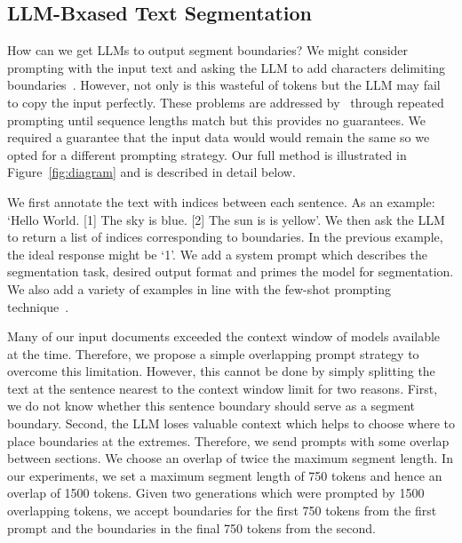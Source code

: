 \subsection{LLM-Bxased Text Segmentation}\label{LLM-Based Text Segmentation}

How can we get LLMs to output segment boundaries? We might consider prompting with the input text and asking the LLM to add characters delimiting boundaries~\citep{XingThesis}. However, not only is this wasteful of tokens but the LLM may fail to copy the input perfectly. These problems are addressed by~\citep{XingThesis} through repeated prompting until sequence lengths match but this provides no guarantees. We required a guarantee that the input data would would remain the same so we opted for a different prompting strategy. Our full method is illustrated in Figure~\ref{fig:diagram} and is described in detail below.

We first annotate the text with indices between each sentence. As an example: `Hello World. [1] The sky is blue. [2] The sun is is yellow'. We then ask the LLM to return a list of indices corresponding to boundaries. In the previous example, the ideal response might be `1'. We add a system prompt which describes the segmentation task, desired output format and primes the model for segmentation. We also add a variety of examples in line with the few-shot prompting technique~\citep{FewShotLearners}. 


Many of our input documents exceeded the context window of models available at the time. Therefore, we propose a simple overlapping prompt strategy to overcome this limitation. However, this cannot be done by simply splitting the text at the sentence nearest to the context window limit for two reasons. First, we do not know whether this sentence boundary should serve as a segment boundary. Second, the LLM loses valuable context which helps to choose where to place boundaries at the extremes. Therefore, we send prompts with some overlap between sections. We choose an overlap of twice the maximum segment length. In our experiments, we set a maximum segment length of 750 tokens and hence an overlap of 1500 tokens. Given two generations which were prompted by 1500 overlapping tokens, we accept boundaries for the first 750 tokens from the first prompt and the boundaries in the final 750 tokens from the second. 

